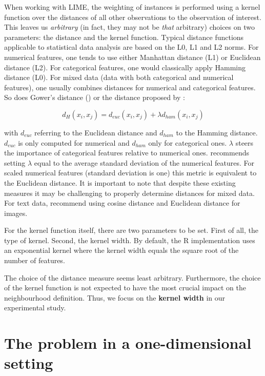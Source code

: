 \documentclass[
]{krantz}
\begin{document}
When working with LIME, the weighting of instances is performed using a kernel function over the distances of all other observations to the observation of interest.
This leaves us \emph{arbitrary} (in fact, they may not be \emph{that} arbitrary) choices on two parameters:
the distance and the kernel function.
Typical distance functions applicable to statistical data analysis are based on the L0, L1 and L2 norms.
For numerical features, one tends to use either Manhattan distance (L1) or Euclidean distance (L2).
For categorical features, one would classically apply Hamming distance (L0).
For mixed data (data with both categorical and numerical features), one usually combines distances for numerical and categorical features.
So does Gower's distance (\citet{gower1971general}) or the distance proposed by \citet{huang1998kproto}:

\[ d_H(x_i, x_j) = d_{euc}(x_i, x_j) + \lambda d_{ham}(x_i, x_j) \]

with \(d_{euc}\) referring to the Euclidean distance and \(d_{ham}\) to the Hamming distance.
\(d_{euc}\) is only computed for numerical and \(d_{ham}\) only for categorical ones.
\(\lambda\) steers the importance of categorical features relative to numerical ones.
\citet{huang1998kproto} recommends setting \(\lambda\) equal to the average standard deviation of the numerical features.
For scaled numerical features (standard deviation is one) this metric is equivalent to the Euclidean distance.
It is important to note that despite these existing measures it may be challenging to properly determine distances for mixed data.
For text data, \citet{ribeiro2016should} recommend using cosine distance and Euclidean distance for images.

For the kernel function itself, there are two parameters to be set.
First of all, the type of kernel.
Second, the kernel width.
By default, the R implementation uses an exponential kernel where the kernel width equals the square root of the number of features.

The choice of the distance measure seems least arbitrary.
Furthermore, the choice of the kernel function is not expected to have the most crucial impact on the neighbourhood definition.
Thus, we focus on the \textbf{kernel width} in our experimental study.

\hypertarget{id3}{%
\section{The problem in a one-dimensional setting}\label{id3}}
\end{document}
